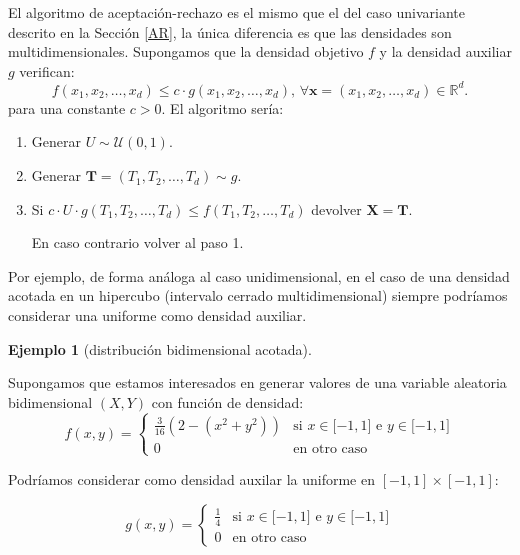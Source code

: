 \documentclass[
]{book}
\theoremstyle{break}
\theoremstyle{definition}
\theoremstyle{definition}
\newtheorem{example}{Ejemplo}[chapter]
\theoremstyle{definition}
\theoremstyle{definition}
\theoremstyle{remark}
\begin{document}
El algoritmo de aceptación-rechazo es el mismo que el del caso univariante descrito en la Sección \ref{AR}, la única diferencia es que las densidades son multidimensionales.
Supongamos que la densidad objetivo \(f\) y la densidad
auxiliar \(g\) verifican:
\[f\left( x_1,x_2,\ldots,x_d\right) \leq c\cdot g\left( x_1,x_2,\ldots,x_d\right) 
\text{, }\forall \mathbf{x} = \left( x_1,x_2,\ldots,x_d\right)\in \mathbb{R}^d\text{.}\]
para una constante \(c>0\).
El algoritmo sería:

\begin{enumerate}
\def\labelenumi{\arabic{enumi}.}
\item
  Generar \(U\sim \mathcal{U}\left( 0,1\right)\).
\item
  Generar \(\mathbf{T} = \left( T_1,T_2,\ldots,T_d\right) \sim g\).
\item
  Si \(c\cdot U\cdot g\left( T_1,T_2,\ldots,T_d\right) \leq f\left( T_1,T_2,\ldots,T_d\right)\)
  devolver \(\mathbf{X}=\mathbf{T}\).

  En caso contrario volver al paso 1.
\end{enumerate}

Por ejemplo, de forma análoga al caso unidimensional, en el caso de una densidad
acotada en un hipercubo (intervalo cerrado multidimensional) siempre podríamos considerar
una uniforme como densidad auxiliar.

\begin{example}[distribución bidimensional acotada]
\protect\hypertarget{exm:ar-bidim}{}{\label{exm:ar-bidim} {} }
\end{example}

Supongamos que estamos interesados en generar valores de una variable aleatoria bidimensional
\(\left( X,Y\right)\) con función de densidad:
\[f(x,y)=\left\{ 
\begin{array}{cl}
\frac{3}{16}\left( 2-\left( x^2+y^2\right) \right)  & \text{si }x\in
\lbrack -1,1]\text{ e }y\in \lbrack -1,1] \\ 
0 & \text{en otro caso}
\end{array}
\right.\]

Podríamos considerar como densidad auxilar la uniforme en \(\left[ -1,1\right] \times\left[ -1,1\right]\):

\[g\left( x, y \right)  =\left\{
\begin{array}{ll}
\frac{1}{4} & \text{si }x\in \lbrack -1,1]\text{ e }y\in \lbrack -1,1] \\
0 &  \text{en otro caso}
\end{array}\right.\]
\end{document}
